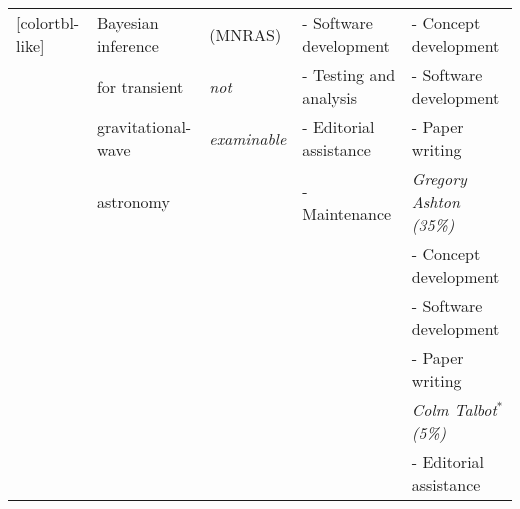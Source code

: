 \begin{table*}
\begin{NiceTabular}{V{50mm}V{2.9cm}V{1.3cm}V{3.4cm}V{3.5cm}}[colortbl-like]
                & Bayesian inference  & (MNRAS)               & - Software development & - Concept development      \\
                & for transient       & \textit{not}          & - Testing and analysis & - Software development     \\
                & gravitational-wave  & \textit{examinable}   & - Editorial assistance & - Paper writing            \\
                & astronomy           &                       & - Maintenance          & \textit{Gregory Ashton (35\%)}      \\
                &                     &                       &                        & - Concept development      \\
                &                     &                       &                        & - Software development     \\
                &                     &                       &                        & - Paper writing            \\
                &                     &                       &                        & \textit{Colm Talbot$^{\ast}$ (5\%)}          \\
                &                     &                       &                        & - Editorial assistance    
\end{NiceTabular}  
\end{table*}